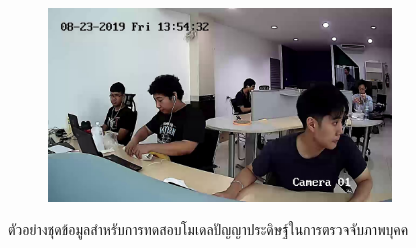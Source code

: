 \begin{figure}[!ht]
\begin{subfigure}[b]{0.55\linewidth}
    \end{subfigure}
    \begin{subfigure}[b]{0.55\linewidth}
      \includegraphics[width=\linewidth]{appendix/images/17.jpg}
    \end{subfigure}
    \caption{ตัวอย่างชุดข้อมูลสำหรับการทดสอบโมเดลปัญญาประดิษฐ์ในการตรวจจับภาพบุคค}
    \label{fig:result_track}
  \end{figure}

